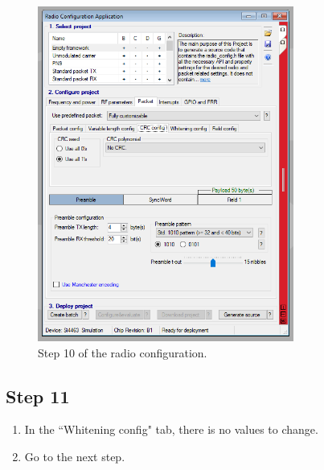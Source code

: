 \documentclass[12pt]{book}
\begin{document}
\begin{appendices}
\begin{figure}[!h]
	\begin{center}
		\includegraphics[width=0.75\textwidth]{figures/wds-tutorial-10.png}
		\caption{Step 10 of the radio configuration.}
		\label{fig:wds-tutorial-step-10}
	\end{center}
\end{figure}

\subsection{Step 11}

\begin{enumerate}
    \item In the ``Whitening config" tab, there is no values to change.
    \item Go to the next step.
\end{enumerate}


\end{appendices}
\end{document}
